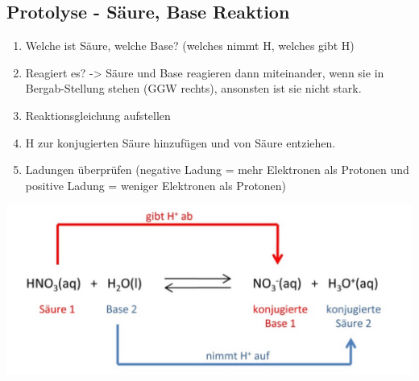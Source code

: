 \subsection{Protolyse - Säure, Base Reaktion}
\begin{enumerate}
	\item Welche ist Säure, welche Base? (welches nimmt H, welches gibt H)
	\item Reagiert es? -> Säure und Base reagieren dann miteinander, wenn sie in Bergab-Stellung stehen (GGW rechts), ansonsten ist sie nicht stark.
	\item Reaktionsgleichung aufstellen
	\item H zur konjugierten Säure hinzufügen und von Säure entziehen.
	\item Ladungen überprüfen (negative Ladung = mehr Elektronen als Protonen und positive Ladung = weniger Elektronen als Protonen)
\end{enumerate}

\begin{center}
\includegraphics[scale=0.2]{pictures/Saure_Base_ex.png}
\end{center}
